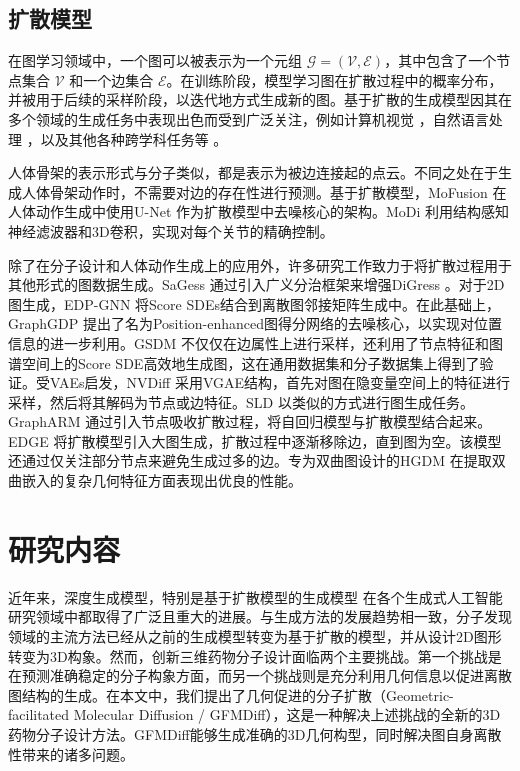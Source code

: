 \subsection{扩散模型}
在图学习领域中，一个图可以被表示为一个元组 $\mathcal{G} = (\mathcal{V}, \mathcal{E})$，其中包含了一个节点集合 $\mathcal{V}$ 和一个边集合 $\mathcal{E}$。在训练阶段，模型学习图在扩散过程中的概率分布，并被用于后续的采样阶段，以迭代地方式生成新的图。基于扩散的生成模型因其在多个领域的生成任务中表现出色而受到广泛关注，例如计算机视觉 \cite{blendeddiffusion_avrahami_22,cascadeddiff_ho_22,gradforshapegen_cai_20,sgmpointcloud_luo_21}，自然语言处理 \cite{struccddpm_austin_21,argmaxflow_hoogeboom_21,stepunrolled_savinov_22}，以及其他各种跨学科任务等 \cite{cdvae_xie_22,housediffusion_shabani_23,nap_lei_23}。

人体骨架的表示形式与分子类似，都是表示为被边连接起的点云。不同之处在于生成人体骨架动作时，不需要对边的存在性进行预测。基于扩散模型，MoFusion \cite{mofusion_dabral_22}在人体动作生成中使用U-Net \cite{unet_ronneberger_15}作为扩散模型中去噪核心的架构。MoDi \cite{modi_raab_22} 利用结构感知神经滤波器和3D卷积，实现对每个关节的精确控制。

除了在分子设计和人体动作生成上的应用外，许多研究工作致力于将扩散过程用于其他形式的图数据生成。SaGess \cite{sagess_limnios_23}通过引入广义分治框架来增强DiGress \cite{digress_vignac_22}。对于2D图生成，EDP-GNN \cite{edpgnn_niu_20}将Score SDEs结合到离散图邻接矩阵生成中。在此基础上，GraphGDP \cite{graphgdp_huang_22}提出了名为Position-enhanced图得分网络的去噪核心，以实现对位置信息的进一步利用。GSDM \cite{gsdm_luo_22}不仅仅在边属性上进行采样，还利用了节点特征和图谱空间上的Score SDE高效地生成图，这在通用数据集和分子数据集上得到了验证。受VAEs启发，NVDiff \cite{nvdiff_chen_22}采用VGAE结构，首先对图在隐变量空间上的特征进行采样，然后将其解码为节点或边特征。SLD \cite{sld_yang_23}以类似的方式进行图生成任务。GraphARM \cite{ardiff_kong_23}通过引入节点吸收扩散过程，将自回归模型与扩散模型结合起来。EDGE \cite{edge_chen_23}将扩散模型引入大图生成，扩散过程中逐渐移除边，直到图为空。该模型还通过仅关注部分节点来避免生成过多的边。专为双曲图设计的HGDM \cite{hgdm_wen_23}在提取双曲嵌入的复杂几何特征方面表现出优良的性能。

\section{研究内容}

近年来，深度生成模型，特别是基于扩散模型的生成模型 \cite{ddpm_ho_20,sgm_song_19,scoresde_song_21}在各个生成式人工智能研究领域中都取得了广泛且重大的进展。与生成方法的发展趋势相一致，分子发现领域的主流方法已经从之前的生成模型转变为基于扩散的模型，并从设计2D图形转变为3D构象。然而，创新三维药物分子设计面临两个主要挑战。第一个挑战是在预测准确稳定的分子构象方面，而另一个挑战则是充分利用几何信息以促进离散图结构的生成。在本文中，我们提出了几何促进的分子扩散（Geometric-facilitated Molecular Diffusion / GFMDiff），这是一种解决上述挑战的全新的3D药物分子设计方法。GFMDiff能够生成准确的3D几何构型，同时解决图自身离散性带来的诸多问题。

